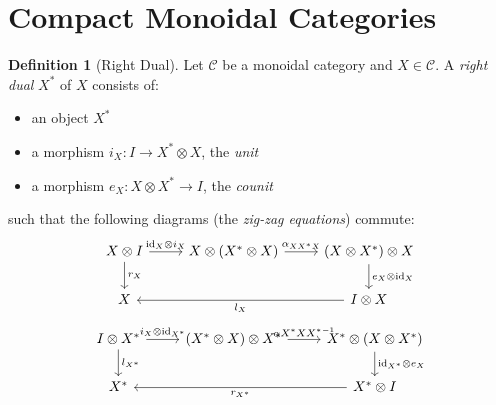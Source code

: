 \documentclass{book}
\theoremstyle{definition}
\newtheorem{df}[lm]{Definition}
\newcommand{\id}[1]{\ensuremath{\mathrm{id}_{#1}}}
\newcommand{\inv}[1]{\ensuremath{{#1}^{-1}}}
\begin{document}
  \section{Compact Monoidal Categories}
  
  \begin{df}[Right Dual]
    Let $\mathcal{C}$ be a monoidal category and $X \in \mathcal{C}$. A 
    \emph{right dual} $X^*$ of $X$ consists of:
    \begin{itemize}
      \item an object $X^*$
      \item a morphism $i_X : I \rightarrow X^* \otimes X$, the \emph{unit}
      \item a morphism $e_X : X \otimes X^* \rightarrow I$, the \emph{counit}
    \end{itemize}
    such that the following diagrams (the \emph{zig-zag equations}) commute:
    \[ \begin{tikzcd}
      X \otimes I \ar[r, "\id{X} \otimes i_X"] \ar[d, "r_X"] &
      X \otimes (X^* \otimes X) \ar[r, "\alpha_{XX^*X}"] &
      (X \otimes X^*) \otimes X \ar[d, "e_X \otimes \id{X}"] \\
      X & & I \otimes X \ar[ll, "l_X"]
    \end{tikzcd} \]
    \[ \begin{tikzcd}
      I \otimes X^* \ar[d, "l_{X^*}"] \ar[r, "i_X \otimes \id{X^*}"] &
      (X^* \otimes X) \otimes X^* \ar[r, "\inv{\alpha{X^*XX^*}}"] &
      X^* \otimes (X \otimes X^*) \ar[d, "\id{X^*} \otimes e_X"] \\
      X^* & & X^* \otimes I \ar[ll, "r_{X^*}"]
    \end{tikzcd}\]
    
  \end{df}
  
\end{document}
